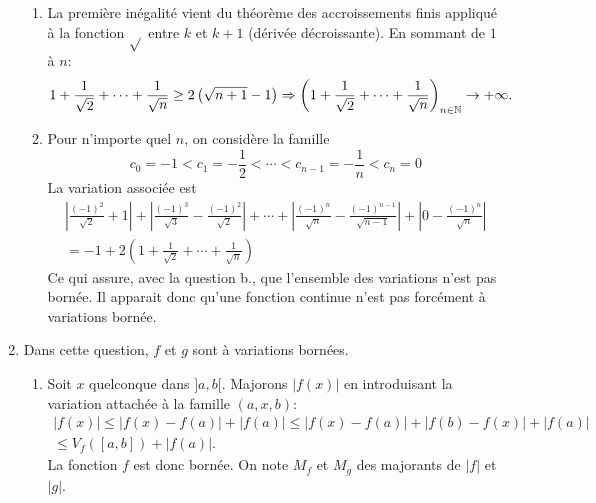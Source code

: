 \begin{enumerate}
\begin{enumerate}
  \item La première inégalité vient du théorème des accroissements finis appliqué à la fonction $\sqrt{}$ entre $k$ et $k+1$ (dérivée décroissante). En sommant de $1$ à $n$:
\begin{displaymath}
  1 + \frac{1}{\sqrt{2}} + \cdots + \frac{1}{\sqrt{n}} \geq 2 \left( \sqrt{n+1} - 1\right)
  \Rightarrow \left( 1 + \frac{1}{\sqrt{2}} + \cdots + \frac{1}{\sqrt{n}}\right)_{n\in \mathbb{N}} \rightarrow +\infty. 
\end{displaymath}

  \item Pour n'importe quel $n$, on considère la famille
\begin{displaymath}
c_0 = -1 <  c_1 = -\frac{1}{2} <  \cdots < c_{n-1} = -\frac{1}{n} < c_n = 0  
\end{displaymath}
La variation associée est
\begin{multline*}
  \left| \frac{(-1)^2}{\sqrt{2}} + 1 \right| + \left| \frac{(-1)^3}{\sqrt{3}} - \frac{(-1)^2}{\sqrt{2}} \right| + \cdots + \left| \frac{(-1)^{n}}{\sqrt{n}} - \frac{(-1)^{n-1}}{\sqrt{n-1}} \right| + \left| 0 - \frac{(-1)^{n}}{\sqrt{n}} \right| \\
= -1 + 2 \left( 1 + \frac{1}{\sqrt{2}} + \cdots + \frac{1}{\sqrt{n}}\right) 
\end{multline*}
Ce qui assure, avec la question b., que l'ensemble des variations n'est pas bornée. Il apparait donc qu'une fonction continue n'est pas forcément à variations bornée.
\end{enumerate}

  \item Dans cette question, $f$ et $g$ sont à variations bornées.
\begin{enumerate}
  \item Soit $x$ quelconque dans $]a,b[$. Majorons $|f(x)|$ en introduisant la variation attachée à la famille $(a,x,b)$:
\begin{multline*}
|f(x)| \leq |f(x)-f(a)| + |f(a)| \leq   |f(x)-f(a)| + |f(b)-f(x)| + |f(a)|\\
\leq V_f([a,b]) + |f(a)| .
\end{multline*}
La fonction $f$ est donc bornée. On note $M_f$ et $M_g$ des majorants de $|f|$ et $|g|$.


\end{enumerate}
\end{enumerate}
